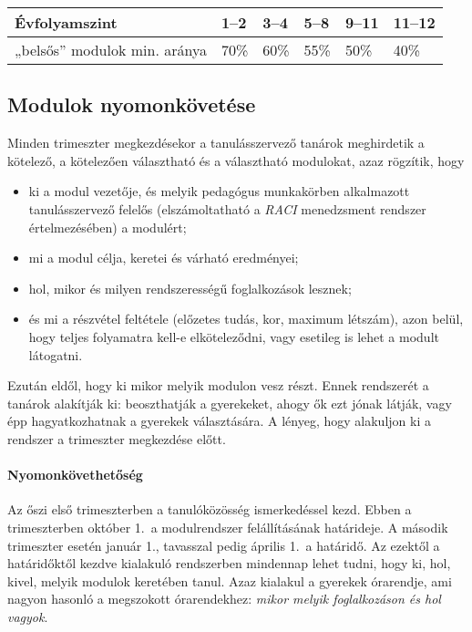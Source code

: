 \begin{longtable}[]{@{}llllll@{}}
\toprule
Évfolyamszint & 1--2 & 3--4 & 5--8 & 9--11 & 11--12\tabularnewline
\midrule
\endhead
„belsős'' modulok min. aránya & 70\% & 60\% & 55\% & 50\% &
40\%\tabularnewline
\bottomrule
\end{longtable}

\hypertarget{modulok-nyomonkovetese}{%
\subsection{Modulok nyomonkövetése}\label{modulok-nyomonkovetese}}

Minden trimeszter megkezdésekor a tanulásszervező tanárok meghirdetik a
kötelező, a kötelezően választható és a választható modulokat, azaz
rögzítik, hogy

\begin{itemize}
\item
  ki a modul vezetője, és melyik pedagógus munkakörben alkalmazott
  tanulásszervező felelős (elszámoltatható a
  {\emph{RACI}}
  menedzsment
  rendszer értelmezésében) a modulért;
\item
  mi a modul célja, keretei és várható eredményei;
\item
  hol, mikor és milyen rendszerességű foglalkozások lesznek;
\item
  és mi a részvétel feltétele (előzetes tudás, kor, maximum létszám),
  azon belül, hogy teljes folyamatra kell-e
  elköteleződni, vagy esetileg is lehet a modult látogatni.
\end{itemize}

Ezután eldől, hogy ki mikor melyik modulon vesz részt. Ennek rendszerét
a tanárok alakítják ki: beoszthatják a gyerekeket, ahogy ők ezt jónak
látják, vagy épp hagyatkozhatnak a gyerekek választására. A lényeg, hogy
alakuljon ki a rendszer a trimeszter megkezdése előtt.

\hypertarget{nyomonkovethetoseg}{%
\paragraph{Nyomonkövethetőség}\label{nyomonkovethetoseg}}

Az őszi első trimeszterben a tanulóközösség ismerkedéssel kezd. Ebben a
trimeszterben október 1.\ a modulrendszer felállításának határideje. A
második trimeszter esetén január 1., tavasszal pedig április 1.\ a határidő.
Az ezektől a határidőktől kezdve kialakuló rendszerben mindennap lehet
tudni, hogy ki, hol, kivel, melyik modulok keretében tanul. Azaz
kialakul a gyerekek órarendje, ami nagyon hasonló a megszokott
órarendekhez: \emph{mikor melyik foglalkozáson és hol vagyok}.

